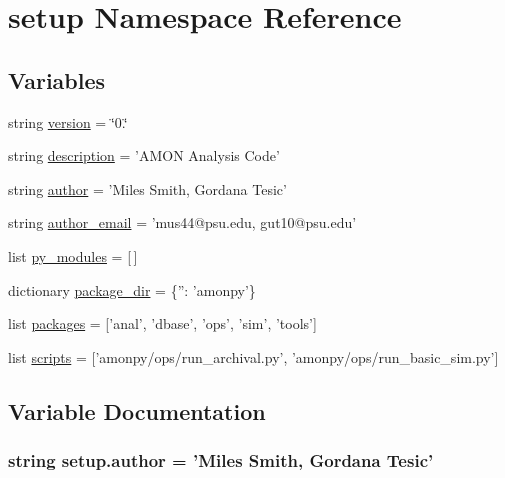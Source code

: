 \hypertarget{namespacesetup}{\section{setup Namespace Reference}
\label{namespacesetup}
}
\subsection*{Variables}
\begin{DoxyCompactItemize}
\item 
string \hyperlink{namespacesetup_ab177531e7a80674a3db3de2d79eb8be7}{version} = \char`\"{}0.\char`\"{}
\item 
string \hyperlink{namespacesetup_ade8aa54df2083113a10326ea2fe7934b}{description} = 'A\-M\-O\-N Analysis Code'
\item 
string \hyperlink{namespacesetup_ac83393287a89728d636e4ae9f4ac914f}{author} = 'Miles Smith, Gordana Tesic'
\item 
string \hyperlink{namespacesetup_aa144ac52ed417d5c65d7377e0e75673e}{author\-\_\-email} = 'mus44@psu.\-edu, gut10@psu.\-edu'
\item 
list \hyperlink{namespacesetup_a2f17d3b44c4dab5ffba788f40bf1397a}{py\-\_\-modules} = \mbox{[}$\,$\mbox{]}
\item 
dictionary \hyperlink{namespacesetup_abf4f1022dcd783f10f7bd23ec931f32b}{package\-\_\-dir} = \{''\-: 'amonpy'\}
\item 
list \hyperlink{namespacesetup_aada4406eeab94f62c5f72fee617f0b82}{packages} = \mbox{[}'anal', 'dbase', 'ops', 'sim', 'tools'\mbox{]}
\item 
list \hyperlink{namespacesetup_ac1f45f8d37050b278bf63c812b1130dd}{scripts} = \mbox{[}'amonpy/ops/run\-\_\-archival.\-py', 'amonpy/ops/run\-\_\-basic\-\_\-sim.\-py'\mbox{]}
\end{DoxyCompactItemize}


\subsection{Variable Documentation}
\hypertarget{namespacesetup_ac83393287a89728d636e4ae9f4ac914f}{
\subsubsection[{author}]{\setlength{\rightskip}{0pt plus 5cm}string setup.\-author = 'Miles Smith, Gordana Tesic'}}\label{namespacesetup_ac83393287a89728d636e4ae9f4ac914f}



